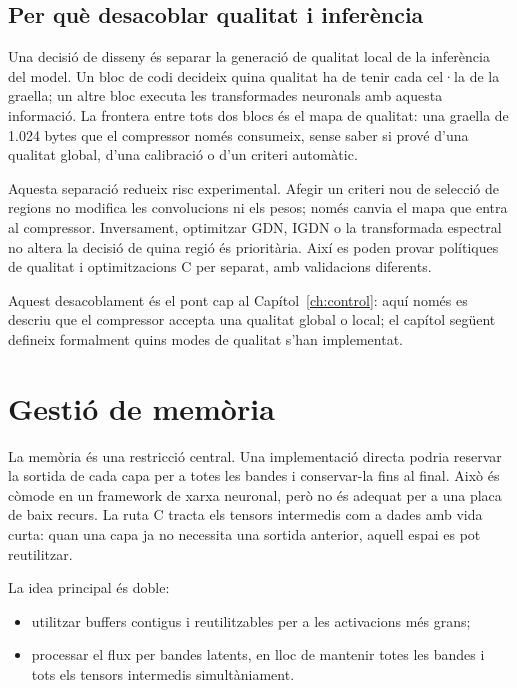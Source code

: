 \subsection{Per què desacoblar qualitat i inferència}

Una decisió de disseny és separar la generació de qualitat local de la
inferència del model. Un bloc de codi decideix quina qualitat ha de tenir cada
cel·la de la graella; un altre bloc executa les transformades neuronals amb
aquesta informació. La frontera entre tots dos blocs és el mapa de qualitat:
una graella de 1.024 bytes que el compressor només consumeix, sense saber si
prové d'una qualitat global, d'una calibració o d'un criteri automàtic.

Aquesta separació redueix risc experimental. Afegir un criteri nou de selecció
de regions no modifica les convolucions ni els pesos; només canvia el mapa que
entra al compressor. Inversament, optimitzar GDN, IGDN o la transformada
espectral no altera la decisió de quina regió és prioritària. Així es poden
provar polítiques de qualitat i optimitzacions C per separat, amb validacions
diferents.

Aquest desacoblament és el pont cap al Capítol~\ref{ch:control}: aquí només es
descriu que el compressor accepta una qualitat global o local; el capítol
següent defineix formalment quins modes de qualitat s'han implementat.

\section{Gestió de memòria}\label{sec:memoria}

La memòria és una restricció central. Una implementació directa podria reservar
la sortida de cada capa per a totes les bandes i conservar-la fins al final.
Això és còmode en un framework de xarxa neuronal, però no és adequat per a una
placa de baix recurs. La ruta C tracta els tensors intermedis com a dades amb
vida curta: quan una capa ja no necessita una sortida anterior, aquell espai es
pot reutilitzar.

La idea principal és doble:

\begin{itemize}[leftmargin=*]
  \item utilitzar buffers contigus i reutilitzables per a les activacions més
  grans;
  \item processar el flux per bandes latents, en lloc de mantenir totes les
  bandes i tots els tensors intermedis simultàniament.
\end{itemize}


